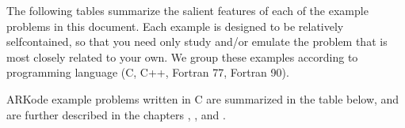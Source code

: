 \documentclass[letterpaper,10pt,english]{sphinxmanual}
\begin{document}
\sphinxAtStartPar
The following tables summarize the salient features of each of the
example problems in this document.  Each example is designed to be
relatively self\sphinxhyphen{}contained, so that you need only study and/or emulate
the problem that is most closely related to your own.  We group these
examples according to programming language (C, C++, Fortran 77,
Fortran 90).

\sphinxAtStartPar
ARKode example problems written in C are summarized in the table
below, and are further described in the chapters {\hyperref[\detokenize{c_serial:serial-c}]{}},
{\hyperref[\detokenize{c_openmp:openmp-c}]{}}, {\hyperref[\detokenize{c_parallel:parallel-c}]{}} and {\hyperref[\detokenize{c_parhyp:parhyp-c}]{}}.
\end{document}
